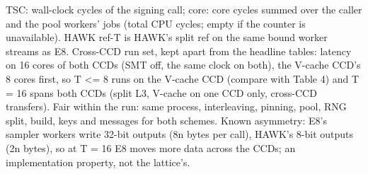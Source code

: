 \begin{table}[t]
\par\smallskip\parbox{\linewidth}{\scriptsize TSC: wall-clock cycles of the signing call; core: core cycles summed over the caller and the pool workers' jobs (total CPU cycles; empty if the counter is unavailable). HAWK ref-T is HAWK's split ref on the same bound worker streams as E8. Cross-CCD run set, kept apart from the headline tables: latency on 16 cores of both CCDs (SMT off, the same clock on both), the V-cache CCD's 8 cores first, so T <= 8 runs on the V-cache CCD (compare with Table 4) and T = 16 spans both CCDs (split L3, V-cache on one CCD only, cross-CCD transfers). Fair within the run: same process, interleaving, pinning, pool, RNG split, build, keys and messages for both schemes. Known asymmetry: E8's sampler workers write 32-bit outputs (8n bytes per call), HAWK's 8-bit outputs (2n bytes), so at T = 16 E8 moves more data across the CCDs; an implementation property, not the lattice's.}
\end{table}

